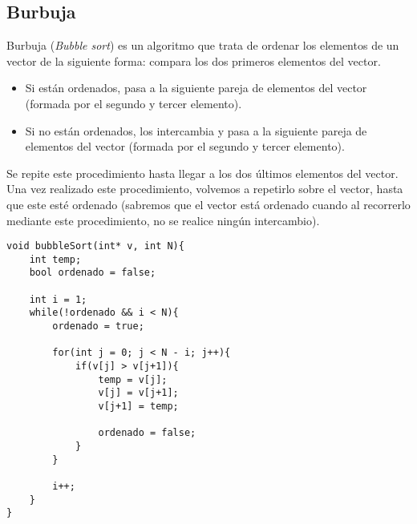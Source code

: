 
\subsection{Burbuja} 
Burbuja (\emph{Bubble sort}) es un algoritmo que trata de ordenar los elementos de un vector de la siguiente forma: compara los dos primeros elementos del vector.
\begin{itemize}
    \item Si están ordenados, pasa a la siguiente pareja de elementos del vector (formada por el segundo y tercer elemento).
    \item Si no están ordenados, los intercambia y pasa a la siguiente pareja de elementos del vector (formada por el segundo y tercer elemento).
\end{itemize}
Se repite este procedimiento hasta llegar a los dos últimos elementos del vector. Una vez realizado este procedimiento, volvemos a repetirlo sobre el vector, hasta que este esté ordenado (sabremos que el vector está ordenado cuando al recorrerlo mediante este procedimiento, no se realice ningún intercambio).
    \begin{verbatim}
void bubbleSort(int* v, int N){
    int temp;
    bool ordenado = false;

    int i = 1; 
    while(!ordenado && i < N){
        ordenado = true;

        for(int j = 0; j < N - i; j++){
            if(v[j] > v[j+1]){
                temp = v[j];
                v[j] = v[j+1];
                v[j+1] = temp;

                ordenado = false;
            }
        }

        i++;
    }
}
    \end{verbatim}

